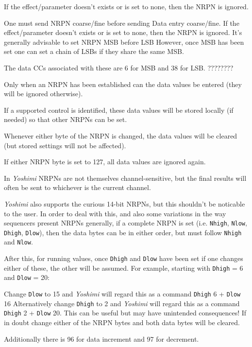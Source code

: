    If the effect/parameter doesn't exists or is set to none, then the NRPN is
   ignored.

   One must send NRPN coarse/fine before sending Data entry coarse/fine.  If
   the effect/parameter doesn't exists or is set to none, then the NRPN is
   ignored.
   It's generally advisable to set NRPN MSB before LSB However, once MSB has
   been set one can set a chain of LSBs if they share the same MSB.

   The data CCs associated with these are 6 for MSB and 38 for LSB. ????????

   Only when an NRPN has been established can the data
   values be entered (they will
   be ignored otherwise).

   If a supported control is identified, these data values will be stored
   locally (if needed) so that other NRPNs can be set.

   Whenever either byte of the NRPN is changed, the data values will be
   cleared (but stored settings will not be affected).

   If either NRPN byte is set to 127, all data values are ignored again.

   In \textsl{Yoshimi} NRPNs are not themselves channel-sensitive, but the
   final results will often be sent to whichever is the current channel.

   \textsl{Yoshimi} also supports the curious 14-bit NRPNs, but this shouldn't
   be noticable to the user. In order to deal with this, and also some
   variations in the way sequencers present NRPNs generally, if a complete
   NRPN is set
   (i.e. \texttt{Nhigh}, \texttt{Nlow}, \texttt{Dhigh}, \texttt{Dlow}),
   then the data bytes can be in
   either order, but must follow \texttt{Nhigh} and \texttt{Nlow}.

   After this, for running values, once
   \texttt{Dhigh} and \texttt{Dlow} have been set if one
   changes either of these, the other will be assumed.
   For example, starting with \texttt{Dhigh} = 6 and \texttt{Dlow} = 20:

   Change \texttt{Dlow} to 15 and \textsl{Yoshimi} will regard this as a
   command \texttt{Dhigh} 6 + \texttt{Dlow} 16 Alternatively change
   \texttt{Dhigh} to 2 and \textsl{Yoshimi} will regard this as a
   command \texttt{Dhigh} 2 + \texttt{Dlow} 20.
   This can be useful but may have unintended consequences!
   If in doubt change either of the NRPN bytes and both data bytes will be
   cleared.

   Additionally there is 96 for data increment and 97 for decrement.

